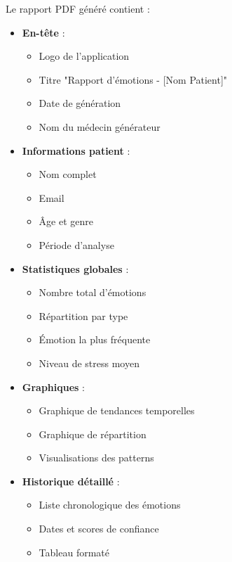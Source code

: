 \documentclass[a4paper,11pt]{report}
\begin{document}
Le rapport PDF généré contient :
\begin{itemize}
    \item \textbf{En-tête} :
    \begin{itemize}
        \item Logo de l'application
        \item Titre "Rapport d'émotions - [Nom Patient]"
        \item Date de génération
        \item Nom du médecin générateur
    \end{itemize}
    
    \item \textbf{Informations patient} :
    \begin{itemize}
        \item Nom complet
        \item Email
        \item Âge et genre
        \item Période d'analyse
    \end{itemize}
    
    \item \textbf{Statistiques globales} :
    \begin{itemize}
        \item Nombre total d'émotions
        \item Répartition par type
        \item Émotion la plus fréquente
        \item Niveau de stress moyen
    \end{itemize}
    
    \item \textbf{Graphiques} :
    \begin{itemize}
        \item Graphique de tendances temporelles
        \item Graphique de répartition
        \item Visualisations des patterns
    \end{itemize}
    
    \item \textbf{Historique détaillé} :
    \begin{itemize}
        \item Liste chronologique des émotions
        \item Dates et scores de confiance
        \item Tableau formaté
    \end{itemize}
    

\end{itemize}
\end{document}

